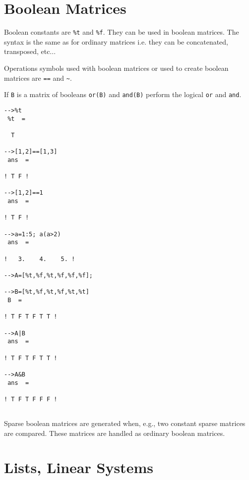 \section{Boolean Matrices}

Boolean constants are {\tt \%t} and {\tt \%f}. They can be used in
boolean matrices. The syntax is the same as for ordinary matrices i.e.
they can be concatenated, transposed, etc...

Operations symbols used with boolean matrices or used to create
boolean matrices are {\tt ==} and \verb!~!. 

If {\tt B} is a matrix of booleans {\tt or(B)} and {\tt and(B)} 
perform the logical {\tt or} and {\tt and}.
\begin{verbatim}
-->%t
 %t  =
 
  T  
 
-->[1,2]==[1,3]
 ans  =
 
! T F !
 
-->[1,2]==1
 ans  =
 
! T F !
 
-->a=1:5; a(a>2)
 ans  =
 
!   3.    4.    5. !

-->A=[%t,%f,%t,%f,%f,%f];   
 
-->B=[%t,%f,%t,%f,%t,%t]
 B  =
 
! T F T F T T !
 
-->A|B
 ans  =
 
! T F T F T T !

-->A&B
 ans  =
 
! T F T F F F !
 
\end{verbatim} 

Sparse boolean matrices are generated when, e.g., two constant sparse
matrices are compared. These matrices are handled as ordinary boolean
matrices.

\section{Lists, Linear Systems}
\label{s2.5}

